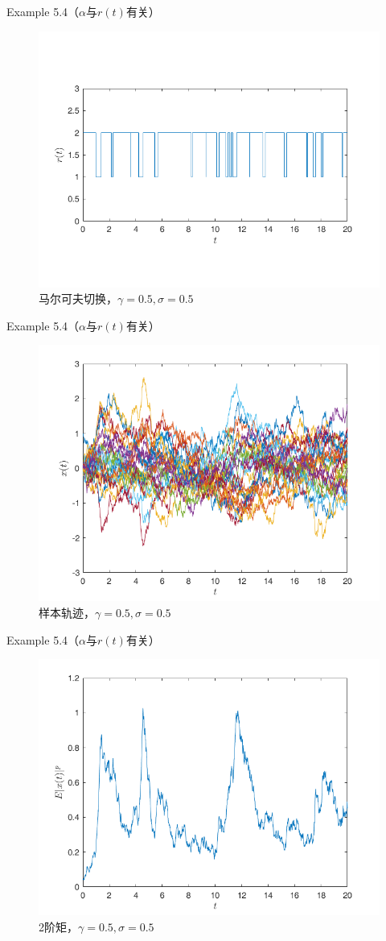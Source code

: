 \documentclass[10pt,aspectratio=43]{beamer}
\begin{document}
\begin{frame}{Example 5.4（$ \alpha $与$ r(t) $有关）
}
\begin{figure}
\centering
\includegraphics[width=0.7\linewidth]{../figures/5}
\caption{马尔可夫切换，$ \gamma=0.5,\sigma=0.5 $}
\end{figure}
\end{frame}

\begin{frame}{Example 5.4（$ \alpha $与$ r(t) $有关）
}
\begin{figure}
\centering
\includegraphics[width=0.7\linewidth]{../figures/6}
\caption{样本轨迹，$ \gamma=0.5,\sigma=0.5 $}
\end{figure}
\end{frame}

\begin{frame}{Example 5.4（$ \alpha $与$ r(t) $有关）
}
\begin{figure}
\centering
\includegraphics[width=0.7\linewidth]{../figures/7}
\caption{2阶矩，$ \gamma=0.5,\sigma=0.5 $}
\end{figure}
\end{frame}
\end{document}
